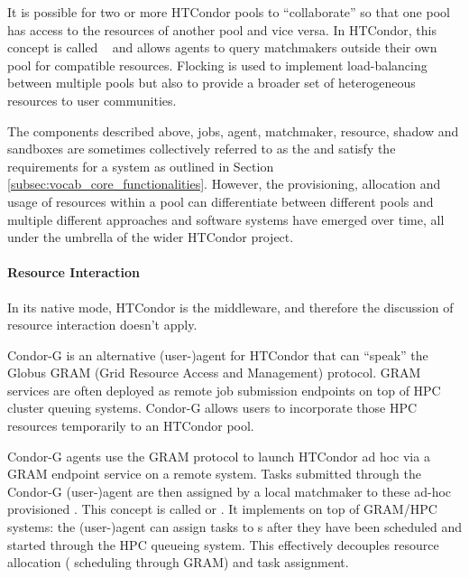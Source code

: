 \documentclass{sig-alternate}
\begin{document}
It is possible for two or more HTCondor pools to ``collaborate'' so that one
pool has access to the resources of another pool and vice versa.
In HTCondor, this concept is called
~\cite{Epema:1996:flocking} and allows agents to query
matchmakers outside their own pool for compatible resources.
Flocking is used to implement load-balancing between multiple pools but also to
provide a broader set of heterogeneous resources to user communities.

The components described above, jobs, agent, matchmaker, resource, shadow and
sandboxes are sometimes collectively referred to as the  and satisfy the requirements for a \pilot system as outlined in
Section \ref{subsec:vocab_core_functionalities}.
However, the provisioning, allocation and usage of resources within a pool can
differentiate between different pools and multiple different approaches and
software systems have emerged over time, all under the umbrella of the wider
HTCondor project.

\paragraph{Resource Interaction}

In its native mode, HTCondor is the middleware, and therefore the discussion of
resource interaction doesn't apply.


Condor-G is an alternative (user-)agent for HTCondor that can ``speak'' the
Globus GRAM (Grid Resource Access and Management) protocol. GRAM services are
often deployed as remote job submission endpoints on top of HPC cluster
queuing systems. Condor-G allows users to incorporate those HPC resources
temporarily to an HTCondor pool.

Condor-G agents use the GRAM protocol to launch HTCondor 
\pilots ad hoc via a GRAM endpoint service on a remote system. Tasks submitted
through the Condor-G (user-)agent are then assigned by a local matchmaker to
these ad-hoc provisioned \pilots. This concept is called 
or . It implements  on top of GRAM/HPC
systems: the (user-)agent can assign tasks to s after
they have been scheduled and started through the HPC queueing system. This
effectively decouples resource allocation ( scheduling through
GRAM) and task assignment.
\end{document}

